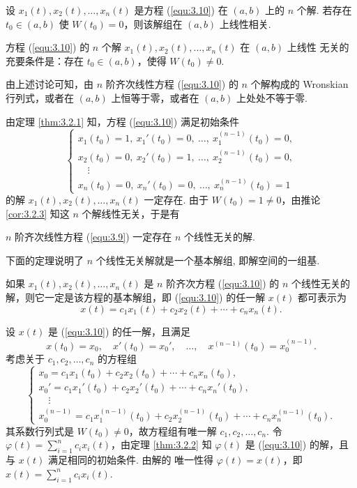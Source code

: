 \begin{cor}\label{cor:3.2.2}
设 $x_1(t),x_2(t),\dots,x_n(t)$ 是方程 (\ref{equ:3.10}) 在 $(a,b)$ 上的 $n$ 个解.
若存在 $t_0\in(a,b)$ 使 $W(t_0)=0$，则该解组在 $(a,b)$ 上线性相关.
\end{cor}

\begin{cor}\label{cor:3.2.3}
方程 (\ref{equ:3.10}) 的 $n$ 个解 $x_1(t),x_2(t),\dots,x_n(t)$ 在 $(a,b)$ 上线性
无关的充要条件是：存在 $t_0\in(a,b)$，使得 $W(t_0)\neq0$.
\end{cor}

由上述讨论可知，由 $n$ 阶齐次线性方程 (\ref{equ:3.10}) 的 $n$ 个解构成的
Wronskian 行列式，或者在 $(a,b)$ 上恒等于零，或者在 $(a,b)$ 上处处不等于零.

由定理 \ref{thm:3.2.1} 知，方程 (\ref{equ:3.10}) 满足初始条件
\[
\begin{cases}
x_1(t_0)=1,\ x_1'(t_0)=0,\ \dots,\ x_1^{(n-1)}(t_0)=0,\\
x_2(t_0)=0,\ x_2'(t_0)=1,\ \dots,\ x_2^{(n-1)}(t_0)=0,\\
\quad\vdots\\
x_n(t_0)=0,\ x_n'(t_0)=0,\ \dots,\ x_n^{(n-1)}(t_0)=1
\end{cases}
\]
的解 $x_1(t),x_2(t),\dots,x_n(t)$ 一定存在. 由于
$W(t_0)=1\neq0$，由推论 \ref{cor:3.2.3} 知这 $n$ 个解线性无关，于是有

\begin{thm}\label{thm:3.2.5}
$n$ 阶齐次线性方程 (\ref{equ:3.9}) 一定存在 $n$ 个线性无关的解.
\end{thm}

下面的定理说明了 $n$ 个线性无关解就是一个基本解组, 即解空间的一组基.
\begin{thm}\label{thm:3.2.6}
如果 $x_1(t),x_2(t),\dots,x_n(t)$ 是 $n$ 阶齐次方程 (\ref{equ:3.10}) 的
$n$ 个线性无关的解，则它一定是该方程的基本解组，即 (\ref{equ:3.10}) 的任一解
$x(t)$ 都可表示为
\[
x(t)=c_1x_1(t)+c_2x_2(t)+\cdots+c_nx_n(t).
\]
\end{thm}
\begin{pf1}
设 $x(t)$ 是 (\ref{equ:3.10}) 的任一解，且满足
\[
x(t_0)=x_0,\quad x'(t_0)=x_0',\quad\dots,\quad
x^{(n-1)}(t_0)=x_0^{(n-1)}.
\]
考虑关于 $c_1,c_2,\dots,c_n$ 的方程组
\[
\begin{cases}
x_0=c_1x_1(t_0)+c_2x_2(t_0)+\cdots+c_nx_n(t_0),\\
x_0'=c_1x_1'(t_0)+c_2x_2'(t_0)+\cdots+c_nx_n'(t_0),\\
\quad\vdots\\
x_0^{(n-1)}=c_1x_1^{(n-1)}(t_0)+c_2x_2^{(n-1)}(t_0)
+\cdots+c_nx_n^{(n-1)}(t_0).
\end{cases}
\]
其系数行列式是 $W(t_0)\neq0$，故方程组有唯一解 $c_1,c_2,\dots,c_n$. 令
$\varphi(t)=\sum\limits_{i=1}^n c_ix_i(t)$，由定理 \ref{thm:3.2.2} 知
$\varphi(t)$ 是 (\ref{equ:3.10}) 的解，且与 $x(t)$ 满足相同的初始条件. 由解的
唯一性得 $\varphi(t)=x(t)$，即 $x(t)=\sum\limits_{i=1}^n c_ix_i(t)$.
\end{pf1}

